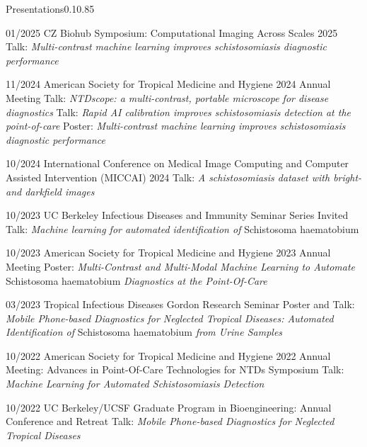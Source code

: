 \documentclass{federico_cv}
\begin{document}
\printbibliography[keyword={Preprints},title={Manuscripts in Preparation},resetnumbers=true]
\let\thefootnote\relax{}\nocite{*}
\printbibliography[keyword={Publications},title={Publications},resetnumbers=true]
\printbibliography[keyword={Patents},title={Patents},resetnumbers=true]


\begin{tblSection}{Presentations}{0.1}{0.85}

\leftbfrightsingle
{01/2025}
{CZ Biohub Symposium: Computational Imaging Across Scales 2025}
{Talk: \textit{Multi-contrast machine learning improves schistosomiasis diagnostic performance}}

\leftbfrightsingle
{11/2024}
{American Society for Tropical Medicine and Hygiene 2024 Annual Meeting}
{Talk: \textit{NTDscope: a multi-contrast, portable microscope for disease diagnostics}}
{Talk: \textit{Rapid AI calibration improves schistosomiasis detection at the point-of-care}}
{Poster: \textit{Multi-contrast machine learning improves schistosomiasis diagnostic performance}}

\leftbfrightsingle
{10/2024}
{International Conference on Medical Image Computing and Computer Assisted Intervention (MICCAI) 2024}
{Talk: \textit{A schistosomiasis dataset with bright- and darkfield images}}

\leftbfrightsingle
{10/2023}
{UC Berkeley Infectious Diseases and Immunity Seminar Series}
{Invited Talk: \textit{Machine learning for automated identification of} Schistosoma haematobium}

\leftbfrightsingle
{10/2023}
{American Society for Tropical Medicine and Hygiene 2023 Annual Meeting}
{Poster: \textit{Multi-Contrast and Multi-Modal Machine Learning to Automate} Schistosoma haematobium \textit{Diagnostics at the Point-Of-Care}}

\leftbfrightsingle
{03/2023}
{Tropical Infectious Diseases Gordon Research Seminar}
{Poster and Talk: \textit{Mobile Phone-based Diagnostics for Neglected Tropical Diseases: Automated Identification of} Schistosoma haematobium \textit{from Urine Samples}}

\leftbfrightsingle
{10/2022}
{American Society for Tropical Medicine and Hygiene 2022 Annual Meeting: Advances in Point-Of-Care Technologies for NTDs Symposium}
{Talk: \textit{Machine Learning for Automated Schistosomiasis Detection}}

\leftbfrightsingle
{10/2022}
{UC Berkeley/UCSF Graduate Program in Bioengineering: Annual Conference and Retreat}
{Talk: \textit{Mobile Phone-based Diagnostics for Neglected Tropical Diseases}}


\end{tblSection}
\end{document}
